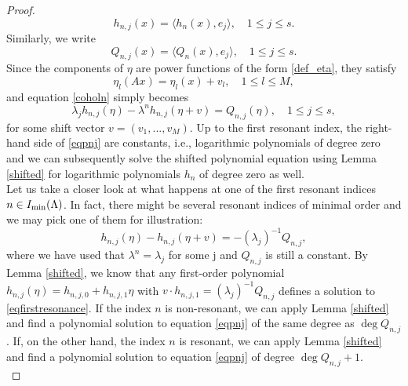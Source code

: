 \documentclass{amsart}
\theoremstyle{plain}
\theoremstyle{definition}
\begin{document}
\begin{proof}
\begin{equation}
    h_{n,j}(x)=\langle h_n(x),e_j\rangle,\quad 1\leq j\leq s. 
\end{equation}
Similarly, we write
\begin{equation}
    Q_{n,j}(x)=\langle Q_n(x),e_j\rangle,\quad 1\leq j\leq s.
\end{equation}
Since the components of $\eta$ are power functions of the form \eqref{def_eta}, they satisfy
\begin{equation}
    \eta_l(Ax) = \eta_l(x) + v_l,\quad 1\leq l\leq M,
\end{equation}
and equation \eqref{coholn} simply becomes 
\begin{equation}\label{eqpnj}
\lambda_jh_{n,j}(\eta)-\lambda^nh_{n,j}(\eta+v)=Q_{n,j}(\eta),\quad 1\leq j\leq s,
\end{equation}
for some shift vector $v=(v_1,...,v_M)$. 
Up to the first resonant index, the right-hand side of \eqref{eqpnj} are constants, i.e., logarithmic polynomials of degree zero and we can subsequently solve the shifted polynomial equation using Lemma \ref{shifted} for logarithmic polynomials $h_n$ of degree zero as well.\\
Let us take a closer look at what happens at one of the first resonant indices $n \in I_{\rm min}(\Lambda)$. In fact, there might be several resonant indices of minimal order and we may pick one of them for illustration:
\begin{equation}\label{eqfirstresonance}
    h_{n,j}(\eta) - h_{n,j}(\eta+v) = -(\lambda_j)^{-1} Q_{n,j},
\end{equation}
where we have used that $\lambda^n=\lambda_j$ for some j and $Q_{n,j}$ is still a constant. By Lemma \ref{shifted}, we know that any first-order polynomial $h_{n,j}(\eta) = h_{n,j,0}+h_{n,j,1}\eta$ with $ v\cdot h_{n,j,1} = (\lambda_j)^{-1} Q_{n,j} $ defines a solution to \eqref{eqfirstresonance}.
If the index $n$ is non-resonant, we can apply Lemma \ref{shifted} and find a polynomial solution to equation \eqref{eqpnj} of the same degree as $\deg Q_{n,j}$. If, on the other hand, the index $n$ is resonant, we can apply Lemma \ref{shifted} and find a polynomial solution to equation \eqref{eqpnj} of degree $\deg Q_{n,j}+1$.\\

\end{proof}
\end{document}
